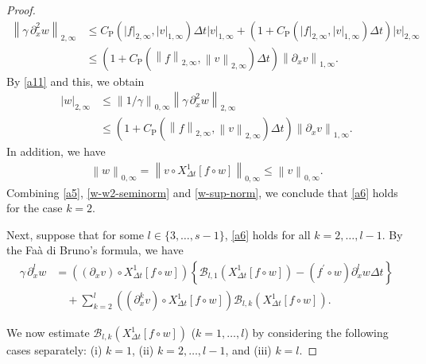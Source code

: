 \documentclass[10pt,a4paper,tbtags,leqno]{amsart}
\theoremstyle{definition}
\numberwithin{equation}{section}
\def\norm#1#2{\left\|#2\right\|_{#1}}
\def\snorm#1#2{\left|#2\right|_{#1}}
\begin{document}
\begin{proof}
  \begin{align}
    \norm{2, \infty}{\gamma \, \partial_x^2 w}
    & \leq C_{\mathrm{P}} (\snorm{2, \infty}{f}, \snorm{1, \infty}{v}) \Delta t \snorm{1, \infty}{v}
    + \left(1 + C_{\mathrm{P}} (\snorm{2, \infty}{f}, \snorm{1, \infty}{v}) \Delta t\right) \snorm{2, \infty}{v} \\
    & \leq \left(1 + C_{\mathrm{P}} (\norm{2, \infty}{f}, \norm{2, \infty}{v}) \Delta t\right) \norm{1, \infty}{\partial_x v}. 
    \label{w-w2-seminorm}
  \end{align}
  By \eqref{a11} and this, we obtain 
  \begin{align}
    \snorm{2, \infty}{w} 
    & \leq \norm{0, \infty}{1/\gamma} \norm{2, \infty}{\gamma \, \partial_x^2 w} \\
    & \leq \left(1 + C_{\mathrm{P}} (\norm{2, \infty}{f}, \norm{2, \infty}{v}) \Delta t\right) \norm{1, \infty}{\partial_x v}. 
  \end{align}
  In addition, we have 
  \begin{align} 
    \norm{0,\infty}{w} = \norm{0,\infty}{v \circ X_{\Delta t}^1 [f \circ w]} \leq \norm{0,\infty}{v}. \label{w-sup-norm} 
  \end{align}
  Combining \eqref{a5}, \eqref{w-w2-seminorm} and \eqref{w-sup-norm}, we conclude that \eqref{a6} holds for the case $ k = 2 $. 

  Next, suppose that for some $ l \in \{3,\ldots,s - 1\} $, \eqref{a6} holds for all $ k = 2, \ldots, l - 1 $. By the Fa\`a di Bruno's formula, we have 
  \begin{align}
    \gamma \, \partial_x^l w
    & = ((\partial_x v) \circ {X_{\Delta t}^1} [f \circ w]) \left\{\mathcal{B}_{l, 1} ({X_{\Delta t}^1} [ f \circ w]) - (f^\prime\circ w) \partial_x^l w \Delta t \right\} \\
    & \quad + \sum_{k=2}^{l} ((\partial_x^k v) \circ {X_{\Delta t}^1} [f \circ w]) \mathcal{B}_{l, k} ({X_{\Delta t}^1} [ f \circ w]). \label{a3} 
  \end{align} 

  We now estimate $ \mathcal{B}_{l, k} ({X_{\Delta t}^1} [ f \circ w]) $ ($ k = 1, \ldots, l $) by considering the following cases separately: (i) $k = 1$, (ii) $k = 2, \ldots, l-1$, and (iii) $ k = l $.
  

\end{proof}
\end{document}
